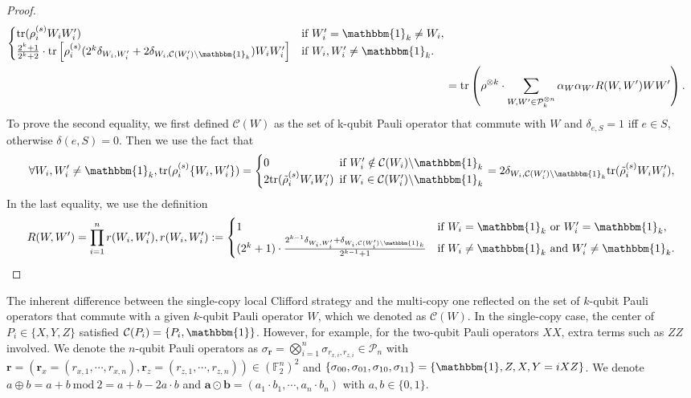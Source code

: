 \documentclass[aps,%
twocolumn,%
floatfix,%
pra,%
amsfonts,%
groupedaddress,%
superscriptaddress]{revtex4-2}%
\newcommand{\1}{\mathbbm{1}}
\begin{document}
\begin{proof}
\begin{align*}
\begin{cases}
         \text{tr}({\rho}^{(s)}_i W_i W'_i)&\text{if~} W'_i = \1_k\neq W_i,\\
         \frac{2^k+1}{2^k+2} \cdot\text{tr}\left[{\rho}^{(s)}_i(2^k\delta_{W_i, W'_i}+2\delta_{W_i, \mathcal{C}(W'_i)\backslash \1_k})W_iW_i'\right]&\text{if~} W_i, W'_i \neq \1_k.
     \end{cases}\\
     &=\text{tr}\left( \rho^{\otimes k}\cdot \sum_{W,W' \in \mathcal{P}_k^{\otimes n}} \alpha_{W}\alpha_{W'} R(W,W') W W'\right).
    \end{align*}
    To prove the second equality, we first defined $\mathcal{C}(W)$ as the set of k-qubit Pauli operator that commute with $W$ and $\delta_{e,S} = 1$ iff $e\in S$, otherwise $\delta(e,S) = 0$. Then we use the fact that
    \begin{align}
        \forall W_i, W'_i \neq \1_k, \text{tr}({\rho}^{(s)}_i\{W_i,W_i'\}) = \begin{cases}0 \!\!\!&\text{if~} W'_i \notin \mathcal{C}(W_i)\backslash \1_k\\2\text{tr}(\tilde{\rho}^{(s)}_i W_iW'_i)  \!\!\!&\text{if~} W_i \in \mathcal{C}(W'_i)\backslash \1_k \end{cases} = 2\delta_{W_i, \mathcal{C}(W'_i)\backslash \1_k} \text{tr}(\tilde{\rho}^{(s)}_i W_iW'_i),
    \end{align}
In the last equality, we use the definition
\begin{align}
    R(W,W') = \prod_{i = 1}^n r(W_i,W'_i),  r(W_i,W'_i) := \begin{cases}
        1 &\text{if~}W_i = \1_k \text{~or~}W'_i = \1_k ,\\
        (2^k+1) \cdot \frac{2^{k-1}\delta_{W_i,W'_i} +\delta_{W_i, \mathcal{C}(W'_i)\backslash \1_k } }{2^{k-1}+1} &\text{if~}W_i \neq \1_k \text{~and~} W'_i \neq \1_k .
    \end{cases}
\end{align}
\end{proof}
The inherent difference between the single-copy local Clifford strategy and the multi-copy one reflected on the set of $k$-qubit Pauli operators that commute with a given $k$-qubit Pauli operator $W$, which we denoted as $ \mathcal{C}(W)$.
In the single-copy case, the center of $P_i \in \{X,Y,Z\}$ satisfied $\mathcal{C}(P_i) = \{P_i, \1\}$.
     However, for example, for the two-qubit Pauli operators $XX$, extra terms such as $ZZ$ involved.
     We denote the $n$-qubit Pauli operators as $\sigma_{\mathbf{r}} = \bigotimes_{i=1}^n \sigma_{{r}_{x,i},{r}_{z,i}} \in \mathcal{P}_n$ with $\mathbf{r} = (\mathbf{r}_x = ({r}_{x,1},\cdots,{r}_{x,n}),\mathbf{r}_z = ({r}_{z,1},\cdots,{r}_{z,n})) \in (\mathbb{F}_2^n)^2$ and $\{\sigma_{00},\sigma_{01},\sigma_{10},\sigma_{11}\} = \{\1, Z,X,Y = iXZ\}$. We denote $a \oplus b = a + b \mathrm{~mod~}2 = a + b - 2a\cdot b$ and $\mathbf{a} \odot \mathbf{b} = (a_1\cdot b_1,\cdots,a_n\cdot b_n)$ with $a,b \in \{0,1\}$.
\end{document}

